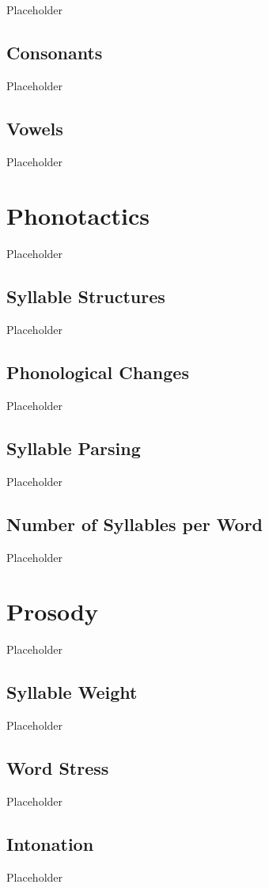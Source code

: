Placeholder

\subsection{Consonants}
\label{subsec:rdk-consonants}

Placeholder

\subsection{Vowels}
\label{subsec:rdk-vowels}

Placeholder

\section{\langrdk{} Phonotactics}
\label{sec:rdk-phonotactics}

Placeholder

\subsection{Syllable Structures}
\label{subsec:rdk-syll-struc}

Placeholder

\subsection{Phonological Changes}
\label{subsec:rdk-phone-changes}

Placeholder

\subsection{Syllable Parsing}
\label{subsec:rdk-syll-parse}

Placeholder

\subsection{Number of Syllables per Word}
\label{subsec:rdk-num-syll}

Placeholder

\section{\langrdk{} Prosody}
\label{sec:rdk-prosody}

Placeholder

\subsection{Syllable Weight}
\label{subsec:rdk-syll-weight}

Placeholder

\subsection{Word Stress}
\label{subsec:rdk-word-stress}

Placeholder

\subsection{Intonation}
\label{subsec:rdk-intonation}

Placeholder